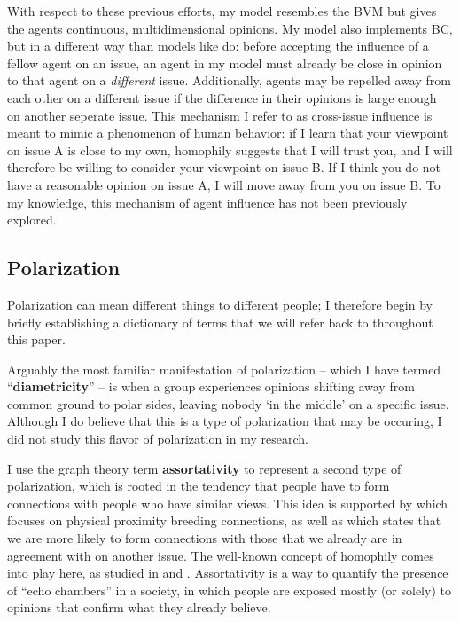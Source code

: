 With respect to these previous efforts, my model resembles the BVM but gives
the agents continuous, multidimensional opinions. My model also implements BC, but in
a different way than models like \cite{tsang_opinion_2014} do: before accepting
the influence of a fellow agent on an issue, an agent in my model must already
be close in opinion to that agent on a \textit{different} issue. Additionally, agents may be repelled away from each other on a different issue if the difference in their opinions is large enough on another seperate issue. This mechanism I refer to as  
cross-issue influence is meant to mimic a phenomenon of human behavior: if I learn that your viewpoint on
issue A is close to my own, homophily suggests that I will trust you, and I
will therefore be willing to consider your viewpoint on issue B. If I think you do not have a reasonable opinion on issue A, I will move away from you on issue B. To my
knowledge, this mechanism of agent influence has not been previously explored.

\subsection{Polarization}

Polarization can mean different things to different people; I therefore begin
by briefly establishing a dictionary of terms that we will refer back to
throughout this paper.

Arguably the most familiar manifestation of polarization -- which I have termed
``\textbf{diametricity}'' -- is when a group experiences opinions shifting away
from common ground to polar sides, leaving nobody `in the middle' on a specific
issue. Although I do believe that this is a type of polarization that may be occuring, I did not study this flavor of polarization in my research.

I use the graph theory term \textbf{assortativity} to represent a second type
of polarization, which is rooted in the tendency that people have to form
connections with people who have similar views. This idea is supported by
\cite{klinkner_red_2005} which focuses on physical proximity breeding
connections, as well as \cite{cholvy_diffusion_2016} which states that we are
more likely to form connections with those that we already are in agreement
with on another issue. The well-known concept of homophily comes into play
here, as studied in \cite{davies_twin_2017} and \cite{taylor_exploring_2018}.
Assortativity is a way to quantify the presence of ``echo chambers'' in a
society, in which people are exposed mostly (or solely) to opinions that
confirm what they already
believe.\cite{dandekar_biased_2013,flaxman_filter_2016}

